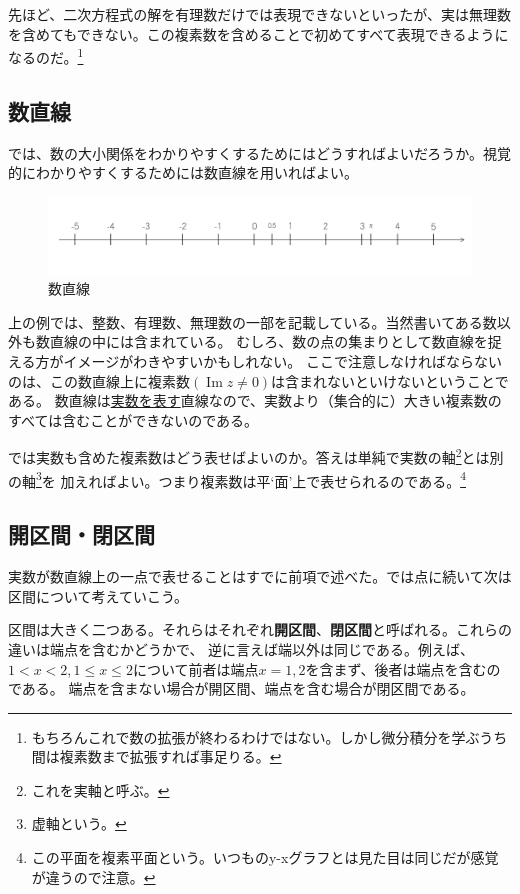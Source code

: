 \documentclass[a4j,dvipdfmx]{jsarticle}
\renewcommand{\Im}{\operatorname{Im}}
\begin{document}
            先ほど、二次方程式の解を有理数だけでは表現できないといったが、実は無理数を含めてもできない。この複素数を含めることで初めてすべて表現できるようになるのだ。\footnote{もちろんこれで数の拡張が終わるわけではない。しかし微分積分を学ぶうち間は複素数まで拡張すれば事足りる。}
        \subsection{数直線}
            では、数の大小関係をわかりやすくするためにはどうすればよいだろうか。視覚的にわかりやすくするためには数直線を用いればよい。
            \begin{figure}[h]
                \centering
                \includegraphics[keepaspectratio,scale=0.5]{img/QuuNote/NumLine_1.png}
                \caption{数直線}
            \end{figure}
            
            上の例では、整数、有理数、無理数の一部を記載している。当然書いてある数以外も数直線の中には含まれている。
            むしろ、数の点の集まりとして数直線を捉える方がイメージがわきやすいかもしれない。
            ここで注意しなければならないのは、この数直線上に複素数$(\Im z\neq 0)$は含まれないといけないということである。
            数直線は\underline{実数を表す}直線なので、実数より（集合的に）大きい複素数のすべては含むことができないのである。

            では実数も含めた複素数はどう表せばよいのか。答えは単純で実数の軸\footnote{これを実軸と呼ぶ。}とは別の軸\footnote{虚軸という。}を
            加えればよい。つまり複素数は平`面'上で表せられるのである。\footnote{この平面を複素平面という。いつものy-xグラフとは見た目は同じだが感覚が違うので注意。}  
            \newpage
        \subsection{開区間・閉区間}
            実数が数直線上の一点で表せることはすでに前項で述べた。では点に続いて次は区間について考えていこう。

            区間は大きく二つある。それらはそれぞれ\textbf{開区間}、\textbf{閉区間}と呼ばれる。これらの違いは端点を含むかどうかで、
            逆に言えば端以外は同じである。例えば、$1<x<2,1\leq x\leq2$について前者は端点$x=1,2$を含まず、後者は端点を含むのである。
            端点を含まない場合が開区間、端点を含む場合が閉区間である。
\end{document}
